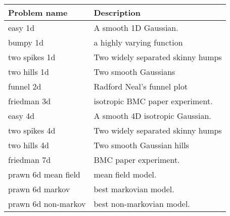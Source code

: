 \begin{table}[h!]
\label{tbl:problem_descriptions}
\begin{center}
\begin{tabular}{ll}
 Problem name & Description \ 
 \\ \midrule 
easy 1d & A smooth 1D Gaussian. \\ 
bumpy 1d & a highly varying function \\ 
two spikes 1d & Two widely separated skinny humps \\ 
two hills 1d & Two smooth Gaussians \\ 
funnel 2d & Radford Neal's funnel plot \\ 
friedman 3d & isotropic BMC paper experiment. \\ 
easy 4d & A smooth 4D isotropic Gaussian. \\ 
two spikes 4d & Two widely separated skinny humps \\ 
two hills 4d & Two smooth Gaussian hills \\ 
friedman 7d & BMC paper experiment. \\ 
prawn 6d mean field & mean field model. \\ 
prawn 6d markov & best markovian model. \\ 
prawn 6d non-markov & best non-markovian model. \\ 
\end{tabular}
\end{center}
\end{table}
